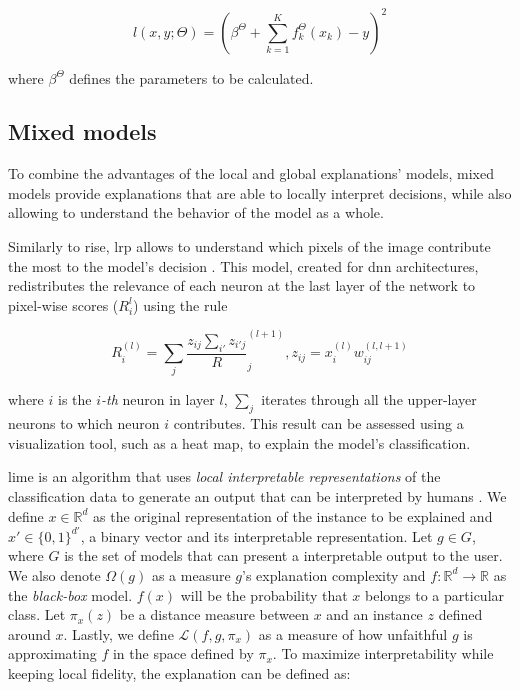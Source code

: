\begin{equation}
l(x,y;\Theta) = (\beta^\Theta +  \sum_{k=1}^K f_k^\Theta(x_k) - y)^2
\end{equation}

where $\beta^\Theta$ defines the parameters to be calculated. 


\subsection{Mixed models}

To combine the advantages of the local and global explanations' models, mixed models provide explanations that are able to locally interpret decisions, while also allowing to understand the behavior of the model as a whole.

Similarly to  \gls{rise}, \gls{lrp} allows to understand which pixels of the image contribute the most to the model's decision \cite{LRP}. This model, created for \gls{dnn} architectures, redistributes the relevance of each neuron at the last layer of the network to pixel-wise scores ($R_{i}^{l}$) using the rule

\begin{equation}
R_i^{(l)} = \sum_j \dfrac{z_{ij}{\sum_{i'} z_{i'j}}} R_{j}^{(l+1)} , z_{ij} = x_i^{(l)}w_{ij}^{(l,l+1)}
\end{equation}

where $i$ is the $i$\textit{-th} neuron in layer $l$, $\sum_j$ iterates through all the upper-layer neurons to which neuron $i$ contributes. This result can be assessed using a visualization tool, such as a heat map, to explain the model's classification.

\gls{lime} is an algorithm that uses \textit{local interpretable representations} of the classification data to generate an output that can be interpreted by humans \cite{LIME}. 
We define $x \in \mathbb{R}^d$ as the original representation of the instance to be explained and $x' \in \{0,1\}^{d'}$, a binary vector and its interpretable representation. Let $g \in G$, where $G$ is the set of models that can present a interpretable output to the user. We also denote $\Omega(g)$ as a measure $g$'s explanation complexity and $ f: \mathbb{R}^d \rightarrow \mathbb{R}$ as the \textit{black-box} model. $f(x)$ will be the probability that $x$ belongs to a particular class. Let $\pi_x(z)$ be a distance measure between $x$ and an instance $z$ defined around $x$. Lastly, we define $\mathcal{L}(f,g,\pi_x)$ as a measure of how unfaithful $g$ is approximating $f$ in the space defined by $\pi_x$. To maximize interpretability while keeping local fidelity, the explanation can be defined as:

